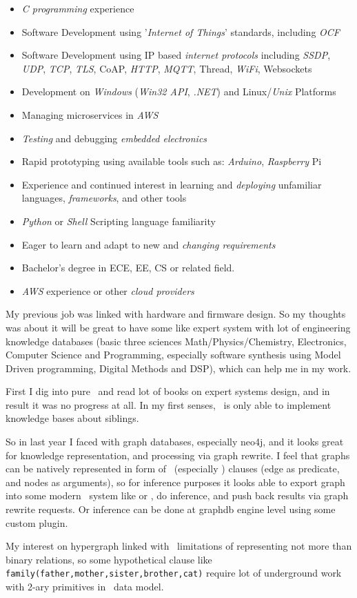 \begin{framed}\noindent
\begin{itemize}[nosep,leftmargin=*]
\item \emph{C programming} experience
\item Software Development using '\emph{Internet of Things}' standards, including \emph{OCF}
\item Software Development using IP based \emph{internet protocols} including \emph{SSDP}, \emph{UDP}, \emph{TCP}, \emph{TLS}, CoAP, \emph{HTTP}, \emph{MQTT}, Thread, \emph{WiFi}, Websockets
\item Development on \emph{Windows} (\emph{Win32 API}, \emph{.NET}) and Linux/\emph{Unix} Platforms
\item Managing microservices in \emph{AWS}
\item \emph{Testing} and debugging \emph{embedded electronics}
\item Rapid prototyping using available tools such as: \emph{Arduino}, \emph{Raspberry} Pi
\item Experience and continued interest in learning and \emph{deploying} unfamiliar languages, \emph{frameworks}, and other tools
\item \emph{Python} or \emph{Shell} Scripting language familiarity
\item Eager to learn and adapt to new and \emph{changing requirements}
\item Bachelor's degree in ECE, EE, CS or related field.
\item \emph{AWS} experience or other \emph{cloud providers}
\end{itemize}
\end{framed}

My previous job was linked with hardware and firmware design. So my thoughts was
about it will be great to have some  like expert system with
lot of engineering knowledge databases (basic three sciences
Math/Physics/Chemistry, Electronics, Computer Science and Programming,
especially software synthesis using Model Driven programming, Digital Methods
and DSP), which can help me in my work.

First I dig into pure \prolog\ and read lot of books on expert systems design,
and in result it was no progress at all. In my first senses, \prolog\ is only
able to implement knowledge bases about siblings.

So in last year I faced with graph databases, especially neo4j, and it looks
great for knowledge representation, and processing via graph rewrite. I feel
that graphs can be natively represented in form of \prolog\ (especially
) clauses (edge as
predicate, and nodes as arguments), so for inference purposes it looks able to
export graph into some modern \prolog\ system like
 or \xsb, do inference,
and push back results via graph rewrite requests. Or inference can be done at
graphdb engine level using some custom plugin.

My interest on hypergraph linked with \neo\ limitations of representing not
more than binary relations, so some hypothetical clause like
\verb|family(father,mother,sister,brother,cat)| require lot of underground work
with 2-ary primitives in \neo\ data model.
